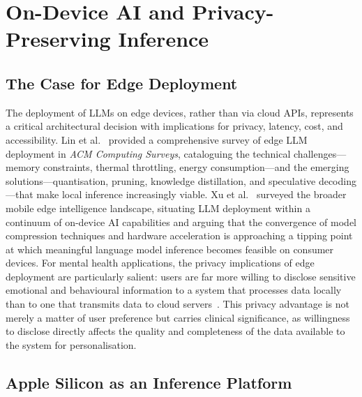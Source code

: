 \section{On-Device AI and Privacy-Preserving Inference}
\label{sec:litrev_ondevice}

\subsection{The Case for Edge Deployment}
\label{sec:litrev_edge_deployment}

The deployment of LLMs on edge devices, rather than via cloud APIs, represents a critical architectural decision with implications for privacy, latency, cost, and accessibility. Lin et al.~\cite{lin2025} provided a comprehensive survey of edge LLM deployment in \textit{ACM Computing Surveys}, cataloguing the technical challenges---memory constraints, thermal throttling, energy consumption---and the emerging solutions---quantisation, pruning, knowledge distillation, and speculative decoding---that make local inference increasingly viable. Xu et al.~\cite{xu2024} surveyed the broader mobile edge intelligence landscape, situating LLM deployment within a continuum of on-device AI capabilities and arguing that the convergence of model compression techniques and hardware acceleration is approaching a tipping point at which meaningful language model inference becomes feasible on consumer devices. For mental health applications, the privacy implications of edge deployment are particularly salient: users are far more willing to disclose sensitive emotional and behavioural information to a system that processes data locally than to one that transmits data to cloud servers~\cite{sharma2024}. This privacy advantage is not merely a matter of user preference but carries clinical significance, as willingness to disclose directly affects the quality and completeness of the data available to the system for personalisation.

\subsection{Apple Silicon as an Inference Platform}
\label{sec:litrev_apple_silicon}

